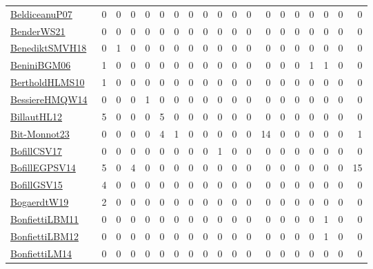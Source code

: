 {\begin{longtable}{l*{18}{r}}
\href{papers/BeldiceanuP07.pdf}{BeldiceanuP07}~\cite{BeldiceanuP07} & 0 & 0 & 0 & 0 & 0 & 0 & 0 & 0 & 0 & 0 & 0 & 0 & 0 & 0 & 0 & 0 & 0 & 0\\
\href{papers/BenderWS21.pdf}{BenderWS21}~\cite{BenderWS21} & 0 & 0 & 0 & 0 & 0 & 0 & 0 & 0 & 0 & 0 & 0 & 0 & 0 & 0 & 0 & 0 & 0 & 0\\
\href{papers/BenediktSMVH18.pdf}{BenediktSMVH18}~\cite{BenediktSMVH18} & 0 & 1 & 0 & 0 & 0 & 0 & 0 & 0 & 0 & 0 & 0 & 0 & 0 & 0 & 0 & 0 & 0 & 0\\
\href{papers/BeniniBGM06.pdf}{BeniniBGM06}~\cite{BeniniBGM06} & 1 & 0 & 0 & 0 & 0 & 0 & 0 & 0 & 0 & 0 & 0 & 0 & 0 & 0 & 1 & 1 & 0 & 0\\
\href{papers/BertholdHLMS10.pdf}{BertholdHLMS10}~\cite{BertholdHLMS10} & 1 & 0 & 0 & 0 & 0 & 0 & 0 & 0 & 0 & 0 & 0 & 0 & 0 & 0 & 0 & 0 & 0 & 0\\
\href{papers/BessiereHMQW14.pdf}{BessiereHMQW14}~\cite{BessiereHMQW14} & 0 & 0 & 0 & 1 & 0 & 0 & 0 & 0 & 0 & 0 & 0 & 0 & 0 & 0 & 0 & 0 & 0 & 0\\
\href{papers/BillautHL12.pdf}{BillautHL12}~\cite{BillautHL12} & 5 & 0 & 0 & 0 & 5 & 0 & 0 & 0 & 0 & 0 & 0 & 0 & 0 & 0 & 0 & 0 & 0 & 0\\
\href{papers/Bit-Monnot23.pdf}{Bit-Monnot23}~\cite{Bit-Monnot23} & 0 & 0 & 0 & 0 & 4 & 1 & 0 & 0 & 0 & 0 & 0 & 14 & 0 & 0 & 0 & 0 & 0 & 1\\
\href{papers/BofillCSV17.pdf}{BofillCSV17}~\cite{BofillCSV17} & 0 & 0 & 0 & 0 & 0 & 0 & 0 & 0 & 1 & 0 & 0 & 0 & 0 & 0 & 0 & 0 & 0 & 0\\
\href{papers/BofillEGPSV14.pdf}{BofillEGPSV14}~\cite{BofillEGPSV14} & 5 & 0 & 4 & 0 & 0 & 0 & 0 & 0 & 0 & 0 & 0 & 0 & 0 & 0 & 0 & 0 & 0 & 15\\
\href{papers/BofillGSV15.pdf}{BofillGSV15}~\cite{BofillGSV15} & 4 & 0 & 0 & 0 & 0 & 0 & 0 & 0 & 0 & 0 & 0 & 0 & 0 & 0 & 0 & 0 & 0 & 0\\
\href{papers/BogaerdtW19.pdf}{BogaerdtW19}~\cite{BogaerdtW19} & 2 & 0 & 0 & 0 & 0 & 0 & 0 & 0 & 0 & 0 & 0 & 0 & 0 & 0 & 0 & 0 & 0 & 0\\
\href{papers/BonfiettiLBM11.pdf}{BonfiettiLBM11}~\cite{BonfiettiLBM11} & 0 & 0 & 0 & 0 & 0 & 0 & 0 & 0 & 0 & 0 & 0 & 0 & 0 & 0 & 0 & 1 & 0 & 0\\
\href{papers/BonfiettiLBM12.pdf}{BonfiettiLBM12}~\cite{BonfiettiLBM12} & 0 & 0 & 0 & 0 & 0 & 0 & 0 & 0 & 0 & 0 & 0 & 0 & 0 & 0 & 0 & 1 & 0 & 0\\
\href{papers/BonfiettiLM14.pdf}{BonfiettiLM14}~\cite{BonfiettiLM14} & 0 & 0 & 0 & 0 & 0 & 0 & 0 & 0 & 0 & 0 & 0 & 0 & 0 & 0 & 0 & 0 & 0 & 0\\

\end{longtable}}
